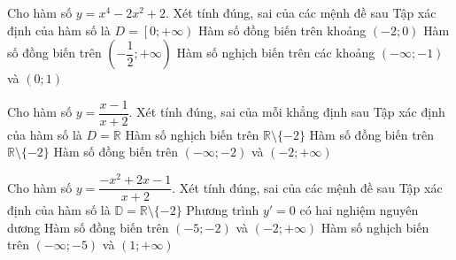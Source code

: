 \begin{ex}%
\end{ex}
\begin{ex}
 Cho hàm số $y=x^4-2x^2+2$. Xét tính đúng, sai của các mệnh đề sau
 \choiceTF
 {Tập xác định của hàm số là $D=\left[ 0;+\infty \right)$}
 {Hàm số đồng biến trên khoảng $(-2;0)$}
 {Hàm số đồng biến trên $\left( -\dfrac{1}{2};+\infty\right)$}
 {Hàm số nghịch biến trên các khoảng $(-\infty;-1)$ và $(0;1)$}
\end{ex}
\begin{ex}
 Cho hàm số $y=\dfrac{x-1}{x+2}$. Xét tính đúng, sai của mỗi khẳng định sau
 \choiceTF
 {Tập xác định của hàm số là $D=\mathbb{R}$}
 {Hàm số nghịch biến trên $\mathbb{R}\setminus\{-2\}$}
 {Hàm số đồng biến trên $\mathbb{R}\setminus\{-2\}$}
 {\True Hàm số đồng biến trên $(-\infty;-2)$ và $(-2;+\infty)$}
\end{ex}
\begin{ex}
    Cho hàm số $y=\dfrac{-x^2+2x-1}{x+2}$. Xét tính đúng, sai của các mệnh đề sau
    \choiceTF
    {Tập xác định của hàm số là $\mathbb{D}=\mathbb{R}\setminus\{-2\}$}
    {Phương trình $y'=0$ có hai nghiệm nguyên dương}
    {Hàm số đồng biến trên $(-5;-2)$ và $(-2;+\infty)$}
    {Hàm số nghịch biến trên $(-\infty;-5)$ và $(1;+\infty)$}
\end{ex}

